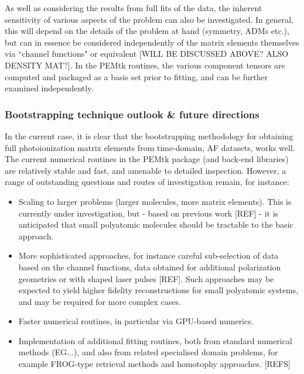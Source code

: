 As well as considering the results from full fits of the data, the inherent sensitivity of various aspects of the problem can also be investigated. In general, this will depend on the details of the problem at hand (symmetry, ADMs etc.), but can in essence be considered independently of the matrix elements themselves via ``channel functions" or equivalent [WILL BE DISCUSSED ABOVE? ALSO DENSITY MAT?]. In the PEMtk routines, the various component tensors are computed and packaged as a basis set prior to fitting, and can be further examined independently.


\subsubsection{Bootstrapping technique outlook \& future directions}

In the current case, it is clear that the bootstrapping methodology for obtaining full photoionization matrix elements from time-domain, AF datasets, works well. The current numerical routines in the PEMtk package (and back-end libraries) are relatively stable and fast, and amenable to detailed inspection. However, a range of outstanding questions and routes of investigation remain, for instance:

\begin{itemize}
\item Scaling to larger problems (larger molecules, more matrix elements). This is currently under investigation, but - based on previous work [REF] - it is anticipated that small polyatomic molecules should be tractable to the basic approach. 
\item More sophisticated approaches, for instance careful sub-selection of data based on the channel functions, data obtained for additional polarization geometries or with shaped laser pulses [REF]. Such approaches may be expected to yield higher fidelity reconstructions for small polyatomic systems, and may be required for more complex cases.
\item Faster numerical routines, in particular via GPU-based numerics.
\item Implementation of additional fitting routines, both from standard numerical methods (EG...), and also from related specialised domain problems, for example FROG-type retrieval methods and homotophy approaches. [REFS] 
\end{itemize}
